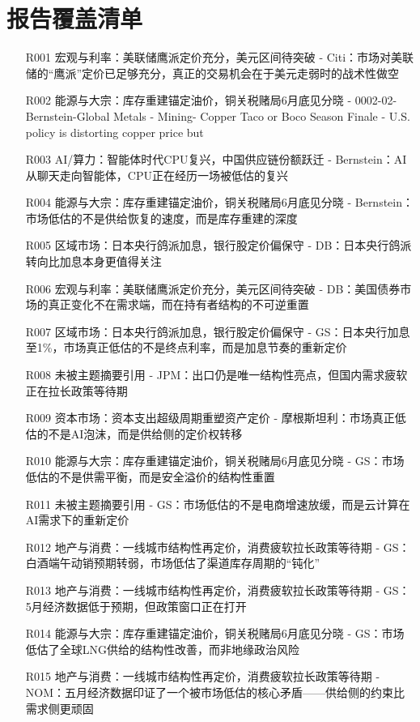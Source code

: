 \documentclass[11pt]{ctexart}
\begin{document}
\section{报告覆盖清单}
\begin{itemize}
  \item [R001] 宏观与利率：美联储鹰派定价充分，美元区间待突破 - Citi：市场对美联储的“鹰派”定价已足够充分，真正的交易机会在于美元走弱时的战术性做空
  \item [R002] 能源与大宗：库存重建锚定油价，铜关税赌局6月底见分晓 - 0002-02-Bernstein-Global Metals - Mining- Copper Taco or Boco Season Finale - U.S. policy is distorting copper price but
  \item [R003] AI/算力：智能体时代CPU复兴，中国供应链份额跃迁 - Bernstein：AI从聊天走向智能体，CPU正在经历一场被低估的复兴
  \item [R004] 能源与大宗：库存重建锚定油价，铜关税赌局6月底见分晓 - Bernstein：市场低估的不是供给恢复的速度，而是库存重建的深度
  \item [R005] 区域市场：日本央行鸽派加息，银行股定价偏保守 - DB：日本央行鸽派转向比加息本身更值得关注
  \item [R006] 宏观与利率：美联储鹰派定价充分，美元区间待突破 - DB：美国债券市场的真正变化不在需求端，而在持有者结构的不可逆重置
  \item [R007] 区域市场：日本央行鸽派加息，银行股定价偏保守 - GS：日本央行加息至1\%，市场真正低估的不是终点利率，而是加息节奏的重新定价
  \item [R008] 未被主题摘要引用 - JPM：出口仍是唯一结构性亮点，但国内需求疲软正在拉长政策等待期
  \item [R009] 资本市场：资本支出超级周期重塑资产定价 - 摩根斯坦利：市场真正低估的不是AI泡沫，而是供给侧的定价权转移
  \item [R010] 能源与大宗：库存重建锚定油价，铜关税赌局6月底见分晓 - GS：市场低估的不是供需平衡，而是安全溢价的结构性重置
  \item [R011] 未被主题摘要引用 - GS：市场低估的不是电商增速放缓，而是云计算在AI需求下的重新定价
  \item [R012] 地产与消费：一线城市结构性再定价，消费疲软拉长政策等待期 - GS：白酒端午动销预期转弱，市场低估了渠道库存周期的“钝化”
  \item [R013] 地产与消费：一线城市结构性再定价，消费疲软拉长政策等待期 - GS：5月经济数据低于预期，但政策窗口正在打开
  \item [R014] 能源与大宗：库存重建锚定油价，铜关税赌局6月底见分晓 - GS：市场低估了全球LNG供给的结构性改善，而非地缘政治风险
  \item [R015] 地产与消费：一线城市结构性再定价，消费疲软拉长政策等待期 - NOM：五月经济数据印证了一个被市场低估的核心矛盾——供给侧的约束比需求侧更顽固

\end{itemize}
\end{document}
